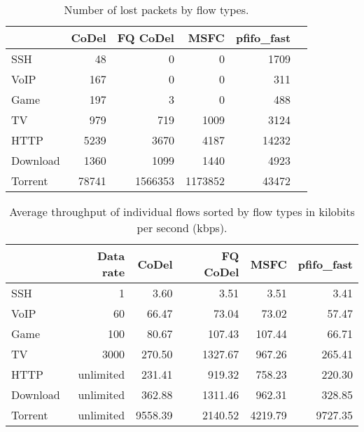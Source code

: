 \begin{table}
	\caption{Number of lost packets by flow types.}
	\label{tab:loss_B}
	\centering
	
	\begin{tabular}{@{}l|rrrrr@{}}
		\toprule
		& {CoDel} & {FQ CoDel} & {MSFC} & {pfifo\_fast}  \\ \midrule
		SSH       &    48         &    0          &    0          &    1709  \\
		VoIP      &    167        &    0          &    0          &    311   \\
		Game      &    197        &    3          &    0          &    488   \\
		TV        &    979        &    719        &    1009       &    3124  \\
		HTTP      &    5239       &    3670       &    4187       &    14232 \\
		Download  &    1360       &    1099       &    1440       &    4923  \\
		Torrent   &    78741      &    1566353    &    1173852    &    43472 \\ \bottomrule
	\end{tabular}
\end{table}

\begin{table}
	\caption{Average throughput of individual flows sorted by flow types in kilobits per second (kbps).}
	\label{tab:throughput_B}
	\centering
	
	\begin{tabular}{@{}l|rrrrr@{}}
		\toprule
		         & {Data rate} & {CoDel} & {FQ CoDel} &  {MSFC} & {pfifo\_fast} \\ \midrule
		SSH      &           1 &    3.60 &       3.51 &    3.51 &          3.41 \\
		VoIP     &          60 &   66.47 &      73.04 &   73.02 &         57.47 \\
		Game     &         100 &   80.67 &     107.43 &  107.44 &         66.71 \\
		TV       &        3000 &  270.50 &    1327.67 &  967.26 &        265.41 \\
		HTTP     &   unlimited &  231.41 &     919.32 &  758.23 &        220.30 \\
		Download &   unlimited &  362.88 &    1311.46 &  962.31 &        328.85 \\
		Torrent  &   unlimited & 9558.39 &    2140.52 & 4219.79 &       9727.35 \\ \bottomrule
	\end{tabular}
\end{table}









